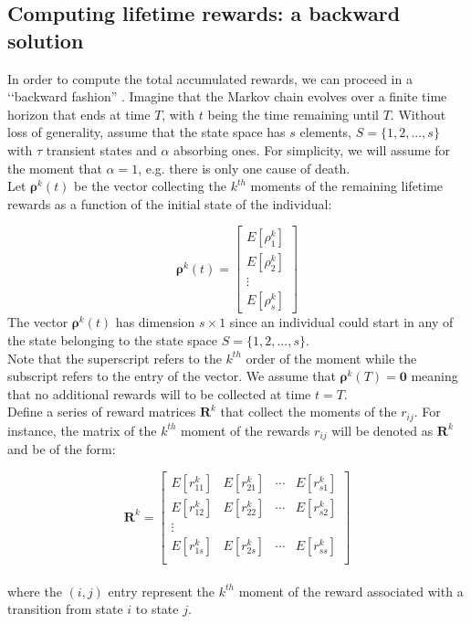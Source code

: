 \documentclass[\main/main.tex]{subfiles}
\begin{document}
\subsection{Computing lifetime rewards: a backward solution}
In order to compute the total accumulated rewards, we can proceed in a \lq\lq backward fashion'' \citep{Caswell2011, Howard1960}. Imagine that the Markov chain evolves over a finite time horizon that ends at time $T$, with $t$ being the time remaining until $T$. Without loss of generality, assume that the state space has $s$ elements, $S=\{1,2,...,s\}$ with $\tau$ transient states and $\alpha$ absorbing ones. For simplicity, we will assume for the moment that $\alpha =1$, e.g. there is only one cause of death.\\

Let $\bm{\rho}^k(t)$ be the vector collecting the $k^{th}$ moments of the remaining lifetime rewards as a function of the initial state of the individual:
    
\begin{equation}
\bm{\rho}^{k}(t) =
\begin{bmatrix}
E[\rho^k_1]\\
E[\rho^k_2]\\
\vdots\\
E[\rho^k_{s}]
\end{bmatrix}
\end{equation}
The vector $\bm{\rho}^k(t)$ has dimension $s \times 1$ since an individual could start in any of the state belonging to the state space $S = \{1,2,..., s\}$.\\ Note that the superscript refers to the $k^{th}$ order of the moment while the subscript refers to the entry of the vector.
We assume that $\bm{\rho}^k(T) = \bm{0}  $  meaning that no additional rewards will to be collected at time $t=T$.\\

Define a series of reward matrices $\mathbf{R}^k$ that collect the moments of the $r_{ij}$. For instance, the matrix of the $k^{th}$ moment of the rewards $r_{ij}$ will be denoted as $\mathbf{R}^k$ and be of the form:

\begin{equation}
 \bm{R}^{k} = 
 \begin{bmatrix}
  E[r^k_{11}]  &  E[r^k_{21}]  & \cdots &  E[r^k_{s1}] \\
E[r^k_{12}]  &  E[r^k_{22}]  & \cdots &  E[r^k_{s2}] \\
\vdots & & &\\
  E[r^k_{1s}]  &  E[r^k_{2s}]  & \cdots &  E[r^k_{ss}] \\
 \end{bmatrix}
\end{equation}\\
where the $(i,j)$ entry represent the $k^{th}$ moment of the reward associated with a transition from state $i$ to state $j$.\\
\end{document}
